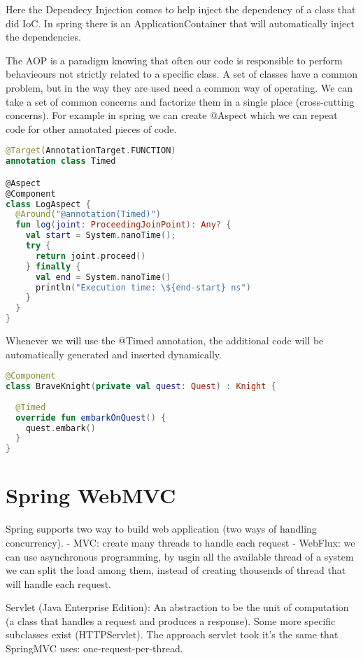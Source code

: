 \documentclass[12pt]{article}
\begin{document}
Here the Dependecy Injection comes to help inject the dependency of a class that did IoC. In spring there is an ApplicationContainer that will automatically inject the dependencies.


The AOP is a paradigm knowing that often our code is responsible to perform behavieours not strictly related to a specific class. A set of classes have a common problem, but in the way they are used need a common way of operating. We can take a set of common concerns and factorize them in a single place (cross-cutting concerns). For example in spring we can create @Aspect which we can repeat code for other annotated pieces of code.
\begin{lstlisting}[language=kotlin]
@Target(AnnotationTarget.FUNCTION)
annotation class Timed

@Aspect
@Component
class LogAspect { 
  @Around("@annotation(Timed)")
  fun log(joint: ProceedingJoinPoint): Any? {
    val start = System.nanoTime();
    try {
      return joint.proceed()
    } finally {
      val end = System.nanoTime()
      println("Execution time: \${end-start} ns")
    }
  }
}
\end{lstlisting}
Whenever we will use the @Timed annotation, the additional code will be automatically generated and inserted dynamically.
\begin{lstlisting}[language=kotlin]
@Component
class BraveKnight(private val quest: Quest) : Knight {
  
  @Timed
  override fun embarkOnQuest() {
    quest.embark()
  }
}
\end{lstlisting}



\section{Spring WebMVC}
Spring supports two way to build web application (two ways of handling concurrency).
- MVC: create many threads to handle each request
- WebFlux: we can use asynchronous programming, by usgin all the available thread of a system we can split the load among them, instead of creating thousends of thread that will handle each request.

Servlet (Java Enterprise Edition):
An abstraction to be the unit of computation (a class that handles a request and produces a response). Some more specific subclasses exist (HTTPServlet). The approach servlet took it's the same that SpringMVC uses: one-request-per-thread.
\end{document}
